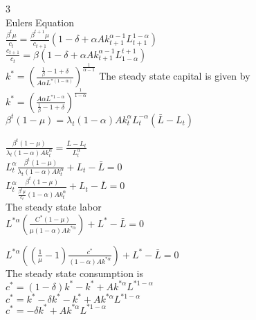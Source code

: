 \documentclass[12pt]{article}
\numberwithin{equation}{subsection} %
\begin{document}
3\\
Eulers Equation\\
$\frac{\beta^{t}\mu}{c_{t}}=\frac{\beta^{t+1}\mu}{c_{t+1}}\left( 1-\delta+\alpha A k_{t+1}^{\alpha-1}L_{t+1}^{1-\alpha} \right)$\\

$\frac{c_{t+1}}{c_{t}}=\beta \left(1-\delta+ \alpha A k_{t+1}^{\alpha-1} L_{1-\alpha}^{t+1} \right)$\\


$k^{*}=\left (\frac{\frac{1}{\beta}-1+\delta}{A \alpha L^{*(1-\alpha)}}  \right)^{\frac{1}{\alpha-1}}$
The steady state capital is given by\\

$k^{*}=\left(\frac{A \alpha L^{*1-\alpha}}{\frac{1}{\beta} -1+\delta} \right)^{\frac{1}{1-\alpha}}$\\






$\beta^{t}(1-\mu)=\lambda_{t}(1-\alpha)Ak_{t}^{\alpha}L_{t}^{-\alpha}(\bar{L}-L_{t})$


$\frac{\beta^{t}(1-\mu)}{\lambda_{t}(1-\alpha)Ak_{t}^{\alpha}}=\frac{\bar{L}-L_{t}}{L_{t}^{\alpha}}$\\

$L_{t}^{\alpha}\frac{\beta^{t}(1-\mu)}{\lambda_{t}(1-\alpha)Ak_{t}^{\alpha}}+L_{t}-\bar{L}=0$\\

$L_{t}^{\alpha}\frac{\beta^{t}(1-\mu)}{\frac{\beta^{t}\mu}{c_{t}}(1-\alpha)Ak_{t}^{\alpha}}+L_{t}-\bar{L}=0$\\

The steady state labor\\

$L^{*\alpha}\left(\frac{C^{*}(1-\mu)}{\mu(1-\alpha)A k^{*\alpha}} \right)+L^{*}-\bar{L}=0$


$L^{*\alpha}\left( (\frac{1}{\mu}-1)\frac{c^{*}}{(1-\alpha)Ak^{*\alpha}}  \right)+L^{*}-\bar{L}=0$\\
The steady state consumption is \\
$c^{*}=(1-\delta)k^{*}-k^{*}+Ak^{*\alpha}L^{* 1-\alpha}$\\
$c^{*}=k^{*}-\delta k^{*}-k^{*}+Ak^{*\alpha}L^{* 1-\alpha}$\\
$c^{*}=-\delta k^{*}+Ak^{*\alpha}L^{* 1-\alpha}$\\
\end{document}
